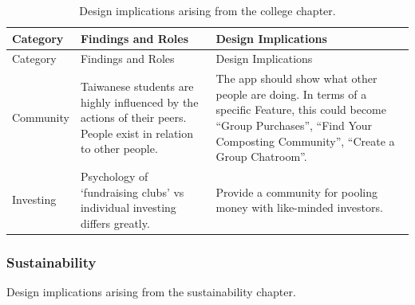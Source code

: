 \documentclass[
  12pt,
  letterpaper,
  DIV=11,
  numbers=noendperiod]{scrartcl}
\begin{document}
\begin{longtable}[]{@{}
  >{\raggedright\arraybackslash}p{}
  >{\raggedright\arraybackslash}p{}
  >{\raggedright\arraybackslash}p{}@{}}
\caption{Design implications arising from the college
chapter.}\tabularnewline
\toprule\noalign{}
\begin{minipage}[b]{\linewidth}\raggedright
Category
\end{minipage} & \begin{minipage}[b]{\linewidth}\raggedright
Findings and Roles
\end{minipage} & \begin{minipage}[b]{\linewidth}\raggedright
Design Implications
\end{minipage} \\
\midrule\noalign{}
\endfirsthead
\toprule\noalign{}
\begin{minipage}[b]{\linewidth}\raggedright
Category
\end{minipage} & \begin{minipage}[b]{\linewidth}\raggedright
Findings and Roles
\end{minipage} & \begin{minipage}[b]{\linewidth}\raggedright
Design Implications
\end{minipage} \\
\midrule\noalign{}
\endhead
\bottomrule\noalign{}
\endlastfoot
Community & Taiwanese students are highly influenced by the actions of
their peers. People exist in relation to other people. & The app should
show what other people are doing. In terms of a specific Feature, this
could become ``Group Purchases'', ``Find Your Composting Community'',
``Create a Group Chatroom''. \\
Investing & Psychology of `fundraising clubs' vs individual investing
differs greatly. & Provide a community for pooling money with
like-minded investors. \\
\end{longtable}

\subsubsection{Sustainability}\label{sustainability-1}

Design implications arising from the sustainability chapter.
\end{document}
